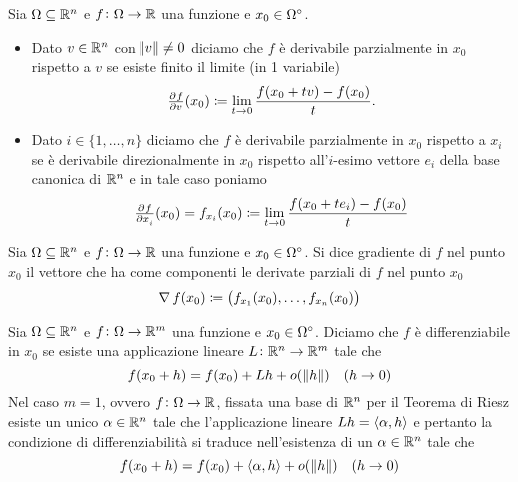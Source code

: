 \begin{definition}
	Sia $ \Omega \subseteq \R^n $ e $ f \colon \Omega \to \R $ una funzione e $ x_0 \in \ouv{\Omega} $. 
	\begin{itemize}
		\item Dato $ v \in \R^n $ con $ \norm{v} \neq 0 $ diciamo che $ f $ è derivabile parzialmente in $ x_0 $ rispetto a $ v $ se esiste finito il limite (in 1 variabile)
		\begin{equation}
			\pd{f}{v}{(x_0)} \coloneqq \lim_{t \to 0} \frac{f(x_0 + tv) - f(x_0)}{t}.
		\end{equation}
		
		\item Dato $ i \in \{1, \ldots, n\} $ diciamo che $ f $ è derivabile parzialmente in $ x_0 $ rispetto a $ x_i $ se è derivabile direzionalmente in $ x_0 $ rispetto all'$ i $-esimo vettore $ e_i $ della base canonica di $ \R^n $ e in tale caso poniamo 
		\begin{equation}
			\pd{f}{x_i}(x_0) = f_{x_i}(x_0) \coloneqq \lim_{t \to 0} \frac{f(x_0 + te_i) - f(x_0)}{t}
		\end{equation}   
	\end{itemize}
\end{definition}

\begin{definition}[gradiente]
	Sia $ \Omega \subseteq \R^n $ e $ f \colon \Omega \to \R $ una funzione e $ x_0 \in \ouv{\Omega} $. Si dice gradiente di $ f $ nel punto $ x_0 $ il vettore che ha come componenti le derivate parziali di $ f $ nel punto $ x_0 $
	\begin{equation}
		\grad{f}(x_0) \coloneqq \left(f_{x_1}(x_0), \ldots, f_{x_n}(x_0)\right)
	\end{equation}
\end{definition}

\begin{definition}
	Sia $ \Omega \subseteq \R^n $ e $ f \colon \Omega \to \R^m $ una funzione e $ x_0 \in \ouv{\Omega} $. Diciamo che $ f $ è differenziabile in $ x_0 $ se esiste una applicazione lineare $ L \colon \R^n \to \R^m $ tale che 
	\begin{equation}
		f(x_0 + h) = f(x_0) + L h + o(\,\norm{h}) \quad (h \to 0)
	\end{equation}
	Nel caso $ m = 1 $, ovvero $ f \colon \Omega \to \R $, fissata una base di $ \R^n $ per il Teorema di Riesz esiste un unico $ \alpha \in \R^n $ tale che l'applicazione lineare $ L h = \sp{\alpha}{h} $ e pertanto la condizione di differenziabilità si traduce nell'esistenza di un $ \alpha \in \R^n $ tale che  
	\begin{equation}
		f(x_0 + h) = f(x_0) + \sp{\alpha}{h} + o(\,\norm{h}) \quad (h \to 0)
	\end{equation}
\end{definition}

